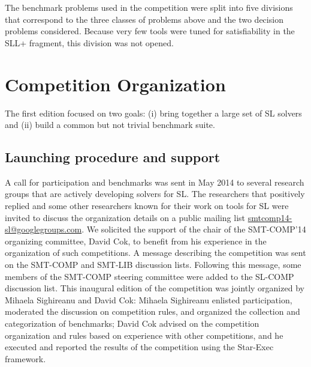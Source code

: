 \documentclass[twoside,11pt]{article}
\begin{document}
The benchmark problems used in the competition were split into five divisions that correspond to the three classes of problems above and the two decision problems considered.
Because very few tools were tuned for satisfiability in the SLL+ fragment, this division was not opened.



\section{Competition Organization}

The first edition focused on two goals:
(i) bring together a large set of SL solvers and
(ii) build a common but not trivial benchmark suite. 

\subsection{Launching procedure and support}
A call for participation and benchmarks was sent
in May 2014 %
to several research groups 
that are actively developing solvers for SL.
The researchers that positively replied and some other researchers known for their work on tools for SL were invited to discuss the organization details on a public mailing list \url{smtcomp14-sl@googlegroups.com}.
We solicited the support of the chair of the SMT-COMP'14 organizing committee, David Cok, to benefit from his experience in the organization of such competitions.
A message describing the competition was sent on the SMT-COMP and SMT-LIB discussion lists. Following this message, some members of the SMT-COMP steering committee were added to the SL-COMP discussion list. 
This inaugural edition of the competition was jointly organized by Mihaela Sighireanu and David Cok:
Mihaela Sighireanu enlisted participation, moderated the discussion on competition rules, and organized the 
collection and categorization of benchmarks; David Cok advised on the competition organization and rules based on experience with other competitions, and he executed and reported the results of the competition using the Star-Exec framework.


\end{document}
